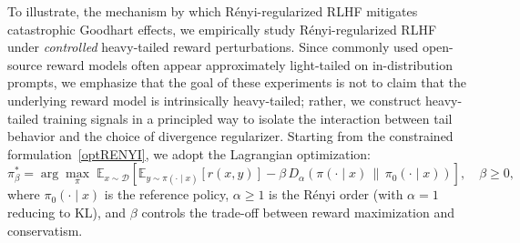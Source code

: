 \documentclass[11pt]{article}
\providecommand{\Renyi}{R\'enyi }
\begin{document}
To illustrate, the mechanism by which R\'enyi-regularized RLHF mitigates catastrophic Goodhart effects, we empirically study R\'enyi-regularized RLHF under \emph{controlled} heavy-tailed reward perturbations. Since commonly used open-source reward models often appear approximately light-tailed on in-distribution prompts, we emphasize that the goal of these experiments is not to claim that the underlying reward model is intrinsically heavy-tailed; rather, we construct heavy-tailed training signals in a principled way to isolate the interaction between tail behavior and the choice of divergence regularizer. Starting from the constrained formulation~\eqref{optRENYI}, we adopt the
Lagrangian optimization:
\begin{equation}\label{optRENYI_penalty}
\pi_{\beta}^{*}
=
\arg\max_{\pi}\;
\mathbb{E}_{x \sim \mathcal{D}}[
\mathbb{E}_{y \sim \pi(\cdot\mid x)}[ r(x,y)]-
\beta\, D_\alpha(\pi(\cdot\mid x) \,\|\, \pi_{0}(\cdot\mid x))],
\quad \beta \ge 0,
\end{equation}
where $\pi_0(\cdot\mid x)$ is the reference policy, $\alpha\ge 1$ is the \Renyi
order (with $\alpha=1$ reducing to KL), and $\beta$ controls the trade-off between
reward maximization and conservatism.
\end{document}
